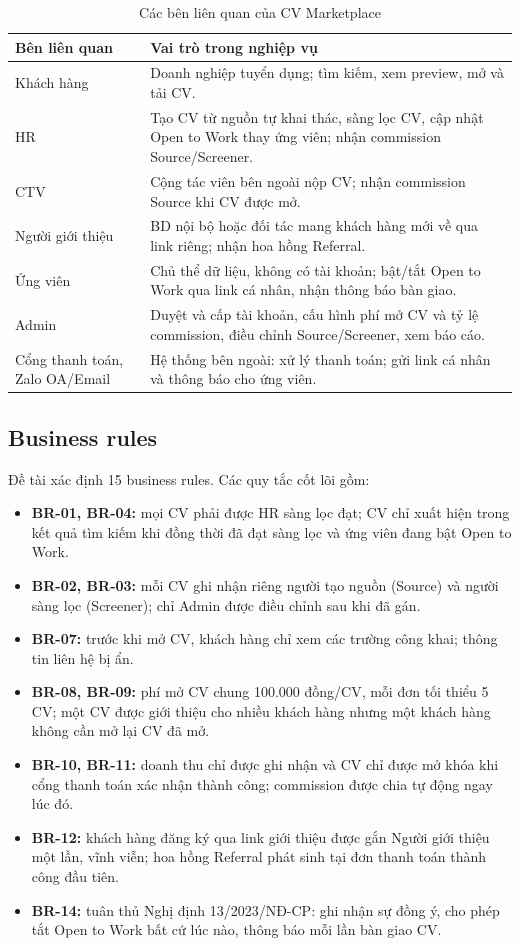 \documentclass[11pt,a4paper]{article}
\begin{document}
\begin{table}[!htbp]
\centering\small
\caption{Các bên liên quan của CV Marketplace}\label{tab:sh}
\begin{tabularx}{\linewidth}{@{}p{3.3cm}L@{}}
\toprule
\textbf{Bên liên quan} & \textbf{Vai trò trong nghiệp vụ}\\\midrule
Khách hàng & Doanh nghiệp tuyển dụng; tìm kiếm, xem preview, mở và tải CV.\\
HR & Tạo CV từ nguồn tự khai thác, sàng lọc CV, cập nhật Open to Work thay ứng viên; nhận commission Source/Screener.\\
CTV & Cộng tác viên bên ngoài nộp CV; nhận commission Source khi CV được mở.\\
Người giới thiệu & BD nội bộ hoặc đối tác mang khách hàng mới về qua link riêng; nhận hoa hồng Referral.\\
Ứng viên & Chủ thể dữ liệu, không có tài khoản; bật/tắt Open to Work qua link cá nhân, nhận thông báo bàn giao.\\
Admin & Duyệt và cấp tài khoản, cấu hình phí mở CV và tỷ lệ commission, điều chỉnh Source/Screener, xem báo cáo.\\
Cổng thanh toán, Zalo OA/Email & Hệ thống bên ngoài: xử lý thanh toán; gửi link cá nhân và thông báo cho ứng viên.\\\bottomrule
\end{tabularx}
\end{table}

\subsection{Business rules}
Đề tài xác định 15 business rules. Các quy tắc cốt lõi gồm:
\begin{itemize}
\item \textbf{BR-01, BR-04:} mọi CV phải được HR sàng lọc đạt; CV chỉ xuất hiện trong kết quả tìm kiếm khi đồng thời đã đạt sàng lọc và ứng viên đang bật Open to Work.
\item \textbf{BR-02, BR-03:} mỗi CV ghi nhận riêng người tạo nguồn (Source) và người sàng lọc (Screener); chỉ Admin được điều chỉnh sau khi đã gán.
\item \textbf{BR-07:} trước khi mở CV, khách hàng chỉ xem các trường công khai; thông tin liên hệ bị ẩn.
\item \textbf{BR-08, BR-09:} phí mở CV chung 100.000 đồng/CV, mỗi đơn tối thiểu 5 CV; một CV được giới thiệu cho nhiều khách hàng nhưng một khách hàng không cần mở lại CV đã mở.
\item \textbf{BR-10, BR-11:} doanh thu chỉ được ghi nhận và CV chỉ được mở khóa khi cổng thanh toán xác nhận thành công; commission được chia tự động ngay lúc đó.
\item \textbf{BR-12:} khách hàng đăng ký qua link giới thiệu được gắn Người giới thiệu một lần, vĩnh viễn; hoa hồng Referral phát sinh tại đơn thanh toán thành công đầu tiên.
\item \textbf{BR-14:} tuân thủ Nghị định 13/2023/NĐ-CP: ghi nhận sự đồng ý, cho phép tắt Open to Work bất cứ lúc nào, thông báo mỗi lần bàn giao CV.
\end{itemize}
\end{document}
